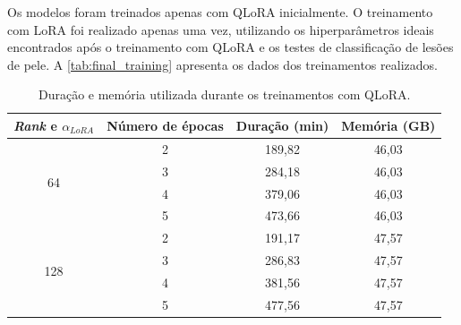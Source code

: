 Os modelos foram treinados apenas com \ac{QLoRA} inicialmente. O treinamento com \ac{LoRA} foi realizado apenas uma
vez, utilizando os hiperparâmetros ideais encontrados após o treinamento com \ac{QLoRA} e os testes de classificação de
lesões de pele. A \autoref{tab:final_training} apresenta os dados dos treinamentos realizados.

\begin{table}[ht]
    \caption{\small Duração e memória utilizada durante os treinamentos com \ac{QLoRA}.}
    \centering
    \begin{tabular}{c|c|c|c}
        \hline
        \textit{Rank} e \begin{math}\alpha_{LoRA}\end{math} & Número de épocas & Duração (min)
                                                            & Memória (GB)
        \\ \hline
        \multirow{4}{*}{64}                                 & 2                & 189,82        &
        46,03                                                                                    \\
                                                            & 3                & 284,18        &
        46,03                                                                                    \\
                                                            & 4                & 379,06        &
        46,03                                                                                    \\
                                                            & 5                & 473,66        &
        46,03                                                                                    \\ \hline
        \multirow{4}{*}{128}                                & 2                & 191,17        &
        47,57                                                                                    \\
                                                            & 3                & 286,83        &
        47,57                                                                                    \\
                                                            & 4                & 381,56        &
        47,57                                                                                    \\
                                                            & 5                & 477,56        &
        47,57                                                                                    \\ \hline
    \end{tabular}
    \label{tab:final_training}
\end{table}

